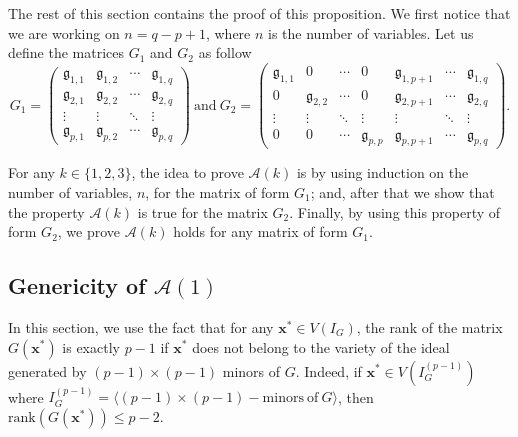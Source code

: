 \documentclass[11pt]{article}
\numberwithin{Property}{section}
\numberwithin{Theorem}{section}
\numberwithin{Proposition}{section}
\numberwithin{Lemma}{section}
\numberwithin{Corollary}{section}
\numberwithin{Definition}{section}
\numberwithin{Remark}{section}
\numberwithin{Conjecture}{section}
\numberwithin{Problem}{section}
\numberwithin{Example}{section}
\numberwithin{Claim}{section}
\renewcommand{\leq}{\leqslant}
\begin{document}
The rest of this section contains the proof of this proposition. We first notice that we are working on $n = q-p+1$, where $n$ is the number of variables. Let us define the matrices $G_1$ and $G_2$ as follow
\[G_1 = \left( \begin{matrix}
\mathfrak{g}_{1,1} & \mathfrak{g}_{1,2} & \cdots  & \mathfrak{g}_{1, q}\\
\mathfrak{g}_{2,1} & \mathfrak{g}_{2,2} & \cdots  & \mathfrak{g}_{2, q}\\
\vdots & \vdots & \ddots & \vdots \\
\mathfrak{g}_{p,1} & \mathfrak{g}_{p,2} & \cdots  & \mathfrak{g}_{p, q}
\end{matrix} \right) \ \mathrm{and} \ 
 G_2 = \left( \begin{matrix}
\mathfrak{g}_{1,1} & 0 & \cdots & 0 & \mathfrak{g}_{1,p+1} & \cdots & \mathfrak{g}_{1, q}\\
0 & \mathfrak{g}_{2,2} & \cdots & 0 & \mathfrak{g}_{2,p+1} & \cdots & \mathfrak{g}_{2, q}\\
\vdots & \vdots & \ddots & \vdots & \vdots & \ddots & \vdots\\
0 & 0 & \cdots & \mathfrak{g}_{p,p} & \mathfrak{g}_{p,p+1} & \cdots & \mathfrak{g}_{p, q}
\end{matrix} \right). \] 

For any $k \in \{1,2,3\}$, the idea to prove $\mathcal{A}(k)$ is by using induction on the number of variables, $n$, for the matrix of form $G_1$; and, after that we show that the property $\mathcal{A}(k)$ is true for the matrix $G_2$. Finally, by using this property of form $G_2$, we prove  $\mathcal{A}(k)$ holds for any matrix of form $G_1$.
\subsection{Genericity of $\mathcal{A}(1)$}
In this section, we use the fact that for any $\mathbf{x}^* \in V(I_G)$, the rank of the matrix $G(\mathbf{x}^*)$ is exactly $p-1$ if $\mathbf{x}^*$ does not belong to the variety of the ideal generated by $(p-1)\times (p-1)$ minors of $G$. Indeed, if $\mathbf{x}^* \in V(I_{G}^{(p-1)})$ where $I_{G}^{(p-1)} = \langle (p-1) \times (p-1) -\mathrm{minors \ of} \ G \rangle$, then $\mathrm{rank}(G(\mathbf{x}^*)) \leq p-2$.
\end{document}
